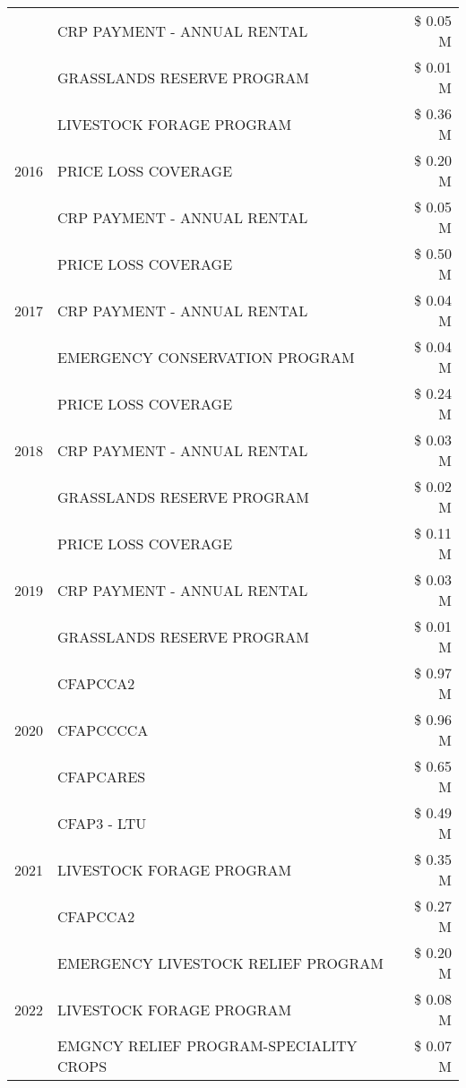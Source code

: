 \begin{tabular}{llr}
 & CRP PAYMENT - ANNUAL RENTAL & \$ 0.05 M \\
 & GRASSLANDS RESERVE PROGRAM & \$ 0.01 M \\
\cline{1-3}
\multirow[t]{3}{*}{2016} & LIVESTOCK FORAGE PROGRAM & \$ 0.36 M \\
 & PRICE LOSS COVERAGE & \$ 0.20 M \\
 & CRP PAYMENT - ANNUAL RENTAL & \$ 0.05 M \\
\cline{1-3}
\multirow[t]{3}{*}{2017} & PRICE LOSS COVERAGE & \$ 0.50 M \\
 & CRP PAYMENT - ANNUAL RENTAL & \$ 0.04 M \\
 & EMERGENCY CONSERVATION PROGRAM & \$ 0.04 M \\
\cline{1-3}
\multirow[t]{3}{*}{2018} & PRICE LOSS COVERAGE & \$ 0.24 M \\
 & CRP PAYMENT - ANNUAL RENTAL & \$ 0.03 M \\
 & GRASSLANDS RESERVE PROGRAM & \$ 0.02 M \\
\cline{1-3}
\multirow[t]{3}{*}{2019} & PRICE LOSS COVERAGE & \$ 0.11 M \\
 & CRP PAYMENT - ANNUAL RENTAL & \$ 0.03 M \\
 & GRASSLANDS RESERVE PROGRAM & \$ 0.01 M \\
\cline{1-3}
\multirow[t]{3}{*}{2020} & CFAPCCA2 & \$ 0.97 M \\
 & CFAPCCCCA & \$ 0.96 M \\
 & CFAPCARES & \$ 0.65 M \\
\cline{1-3}
\multirow[t]{3}{*}{2021} & CFAP3 - LTU & \$ 0.49 M \\
 & LIVESTOCK FORAGE PROGRAM & \$ 0.35 M \\
 & CFAPCCA2 & \$ 0.27 M \\
\cline{1-3}
\multirow[t]{3}{*}{2022} & EMERGENCY LIVESTOCK RELIEF PROGRAM & \$ 0.20 M \\
 & LIVESTOCK FORAGE PROGRAM & \$ 0.08 M \\
 & EMGNCY RELIEF PROGRAM-SPECIALITY CROPS & \$ 0.07 M \\
\cline{1-3}
\bottomrule
\end{tabular}

